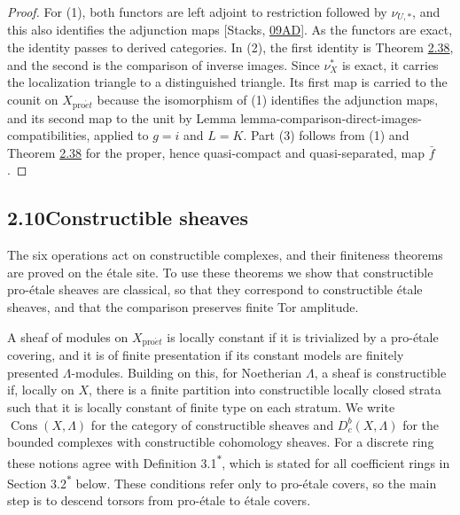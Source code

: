 \documentclass[11pt]{article}
\newcommand{\bpout}[1]{#1\textsuperscript{\hyperlink{bp-outside}{\ensuremath{\ast}}}}
\providecommand{\Cons}{}\renewcommand{\Cons}{\operatorname{Cons}}
\providecommand{\Dbc}{}\renewcommand{\Dbc}{D^b_c}
\begin{document}
\begin{proof}[{Proof}]\label{bp118}%
For (1), both functors are left adjoint to restriction followed by \(\nu_{U,*}\), and this also identifies the adjunction maps [Stacks, \href{https://stacks.math.columbia.edu/tag/09AD}{09AD}]. As the functors are exact, the identity passes to derived categories. In (2), the first identity is Theorem \hyperref[bp111]{2.38}, and the second is the comparison of inverse images. Since \(\nu_X^*\) is exact, it carries the localization triangle to a distinguished triangle. Its first map is carried to the counit on \(X_{\mathrm{pro}\acute{e}t}\) because the isomorphism of (1) identifies the adjunction maps, and its second map to the unit by Lemma lemma-comparison-direct-images-compatibilities, applied to \(g=i\) and \(L=K\). Part (3) follows from (1) and Theorem \hyperref[bp111]{2.38} for the proper, hence quasi-compact and quasi-separated, map \(\bar f\).
\end{proof}


\subsection*{\texorpdfstring{2.10\quad Constructible sheaves}{2.10 Constructible sheaves}}
\label{bp119}%
\label{bp120}%
The six operations act on constructible complexes, and their finiteness theorems are proved on the étale site. To use these theorems we show that constructible pro-étale sheaves are classical, so that they correspond to constructible étale sheaves, and that the comparison preserves finite Tor amplitude.

A sheaf of modules on \(X_{\mathrm{pro}\acute{e}t}\) is locally constant if it is trivialized by a pro-étale covering, and it is of finite presentation if its constant models are finitely presented \(\Lambda\)-modules. Building on this, for Noetherian \(\Lambda\), a sheaf is constructible if, locally on \(X\), there is a finite partition into constructible locally closed strata such that it is locally constant of finite type on each stratum. We write \(\Cons(X,\Lambda)\) for the category of constructible sheaves and \(\Dbc(X,\Lambda)\) for the bounded complexes with constructible cohomology sheaves. For a discrete ring these notions agree with Definition \bpout{3.1}, which is stated for all coefficient rings in Section \bpout{3.2} below. These conditions refer only to pro-étale covers, so the main step is to descend torsors from pro-étale to étale covers.
\end{document}
